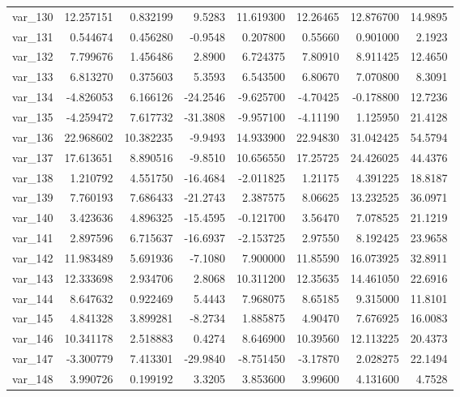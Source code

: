 ﻿\documentclass[12pt]{article}
\begin{document}
\begin{longtable}{lrrrrrrr}
 var\_130 &  12.257151 &   0.832199 &   9.5283 &  11.619300 &  12.26465 &  12.876700 &  14.9895 \\
 var\_131 &   0.544674 &   0.456280 &  -0.9548 &   0.207800 &   0.55660 &   0.901000 &   2.1923 \\
 var\_132 &   7.799676 &   1.456486 &   2.8900 &   6.724375 &   7.80910 &   8.911425 &  12.4650 \\
 var\_133 &   6.813270 &   0.375603 &   5.3593 &   6.543500 &   6.80670 &   7.070800 &   8.3091 \\
 var\_134 &  -4.826053 &   6.166126 & -24.2546 &  -9.625700 &  -4.70425 &  -0.178800 &  12.7236 \\
 var\_135 &  -4.259472 &   7.617732 & -31.3808 &  -9.957100 &  -4.11190 &   1.125950 &  21.4128 \\
 var\_136 &  22.968602 &  10.382235 &  -9.9493 &  14.933900 &  22.94830 &  31.042425 &  54.5794 \\
 var\_137 &  17.613651 &   8.890516 &  -9.8510 &  10.656550 &  17.25725 &  24.426025 &  44.4376 \\
 var\_138 &   1.210792 &   4.551750 & -16.4684 &  -2.011825 &   1.21175 &   4.391225 &  18.8187 \\
 var\_139 &   7.760193 &   7.686433 & -21.2743 &   2.387575 &   8.06625 &  13.232525 &  36.0971 \\
 var\_140 &   3.423636 &   4.896325 & -15.4595 &  -0.121700 &   3.56470 &   7.078525 &  21.1219 \\
 var\_141 &   2.897596 &   6.715637 & -16.6937 &  -2.153725 &   2.97550 &   8.192425 &  23.9658 \\
 var\_142 &  11.983489 &   5.691936 &  -7.1080 &   7.900000 &  11.85590 &  16.073925 &  32.8911 \\
 var\_143 &  12.333698 &   2.934706 &   2.8068 &  10.311200 &  12.35635 &  14.461050 &  22.6916 \\
 var\_144 &   8.647632 &   0.922469 &   5.4443 &   7.968075 &   8.65185 &   9.315000 &  11.8101 \\
 var\_145 &   4.841328 &   3.899281 &  -8.2734 &   1.885875 &   4.90470 &   7.676925 &  16.0083 \\
 var\_146 &  10.341178 &   2.518883 &   0.4274 &   8.646900 &  10.39560 &  12.113225 &  20.4373 \\
 var\_147 &  -3.300779 &   7.413301 & -29.9840 &  -8.751450 &  -3.17870 &   2.028275 &  22.1494 \\
 var\_148 &   3.990726 &   0.199192 &   3.3205 &   3.853600 &   3.99600 &   4.131600 &   4.7528 \\

\end{longtable}
\end{document}

